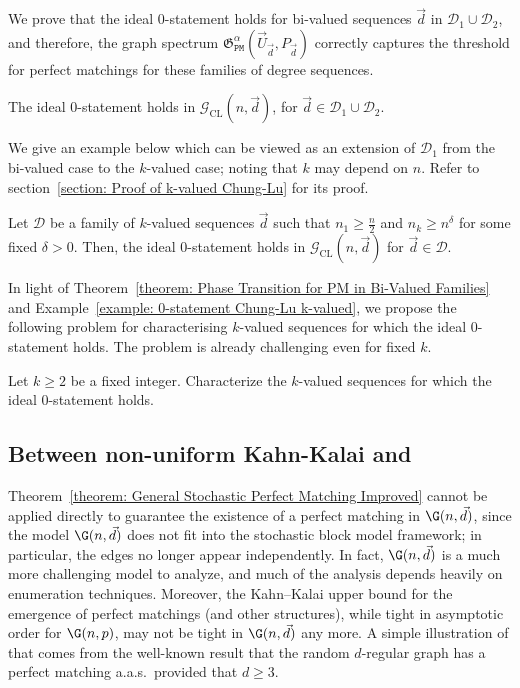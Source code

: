 \documentclass[12pt]{article}
\begin{document}
We prove that the ideal 0-statement holds for bi-valued sequences $\vec{d}$ in $\mathcal{D}_1\cup\mathcal{D}_2$, and therefore, the graph spectrum $\mathfrak{G}_{\texttt{PM}}^\alpha(\vec{U}_{\vec{d}}, P_{\vec{d}})$ correctly captures the threshold for perfect matchings for these families of degree sequences.


\begin{theorem}
\label{theorem: Phase Transition for PM in Bi-Valued Families}
The ideal 0-statement holds in $\mathcal{G}_{\text{CL}}(n, \vec{d})$, for $\vec{d}\in\mathcal{D}_1\cup\mathcal{D}_2$.
\end{theorem}

We give an example below which can be viewed as an extension of $\mathcal{D}_1$ from the bi-valued case to the $k$-valued case; noting that $k$  may depend on $n$. Refer to section~\ref{section: Proof of k-valued Chung-Lu} for its proof. 

\begin{example}
\label{example: 0-statement Chung-Lu k-valued}
 Let $\mathcal{D}$ be a family of $k$-valued sequences $\vec{d}$ such that $n_1\geq\frac{n}{2}$ and $n_k \ge n^{\delta}$ for some fixed $\delta>0$. Then, the ideal 0-statement holds in $\mathcal{G}_{\text{CL}}(n,\vec{d})$ for $\vec{d}\in\mathcal{D}$.    
\end{example}

In light of Theorem~\ref{theorem: Phase Transition for PM in Bi-Valued Families} and Example~\ref{example: 0-statement Chung-Lu k-valued}, we propose the following problem for characterising $k$-valued sequences for which the ideal 0-statement holds. The problem is already challenging even for fixed $k$.



\begin{problem} Let $k\ge 2$ be a fixed integer.
Characterize the $k$-valued sequences for which the ideal $0$-statement holds.
\end{problem}


\subsection{Between non-uniform Kahn-Kalai and }
\label{section:G(n,d) results}


Theorem~\ref{theorem: General Stochastic Perfect Matching Improved} cannot be applied directly to guarantee the existence of a perfect matching in $\G(n,\vec{d})$, since the model $\G(n,\vec{d})$  does not fit into the stochastic block model framework; in particular, the edges no longer appear independently. In fact, $\G(n,\vec{d})$ is a much more challenging model to analyze, and much of the analysis depends heavily on enumeration techniques. Moreover, the Kahn–Kalai upper bound for the emergence of perfect matchings (and other structures), while tight in asymptotic order for $\G(n,p)$, may not be tight in $\G(n,\vec{d})$ any more. A simple illustration of that comes from the well-known result that the random $d$-regular graph has a perfect matching a.a.s.\ provided that $d\ge 3$.
\end{document}
